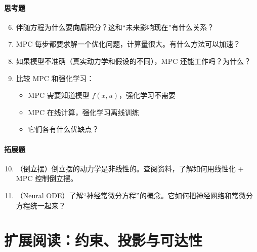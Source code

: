 \paragraph{思考题}
\begin{enumerate}
    \setcounter{enumi}{5}
    \item 伴随方程为什么要\textbf{向后}积分？这和“未来影响现在”有什么关系？
    
    \item MPC 每步都要求解一个优化问题，计算量很大。有什么方法可以加速？
    
    \item 如果模型不准确（真实动力学和假设的不同），MPC 还能工作吗？为什么？
    
    \item 比较 MPC 和强化学习：
    \begin{itemize}
        \item MPC 需要知道模型 $f(x, u)$，强化学习不需要
        \item MPC 在线计算，强化学习离线训练
        \item 它们各有什么优缺点？
    \end{itemize}
\end{enumerate}

\paragraph{拓展题}
\begin{enumerate}
    \setcounter{enumi}{9}
    \item （倒立摆）倒立摆的动力学是非线性的。查阅资料，了解如何用线性化 + MPC 控制倒立摆。
    
    \item （Neural ODE）了解“神经常微分方程”的概念。它如何把神经网络和常微分方程统一起来？
\end{enumerate}

\section*{扩展阅读：约束、投影与可达性}

